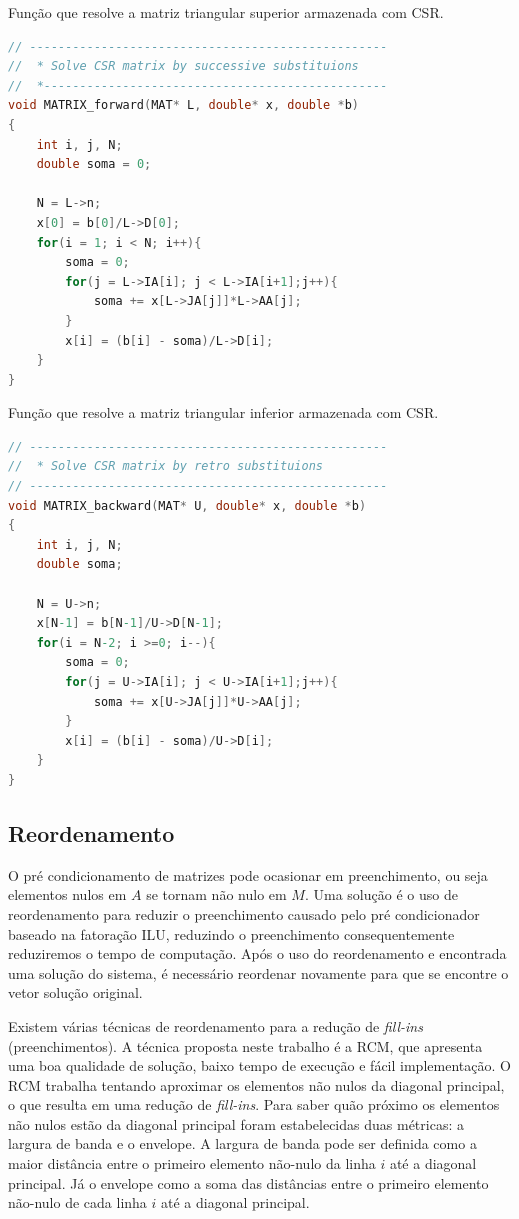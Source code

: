 \documentclass[
	11pt,				%
	oneside,			%
	a4paper,			%
	english,			%
	brazil,				%
	]{article}
\begin{document}
Função que resolve a matriz triangular superior armazenada com CSR.
\begin{lstlisting}[language=C, caption=Matrix Forward ]
// --------------------------------------------------
//  * Solve CSR matrix by successive substituions
//  *------------------------------------------------
void MATRIX_forward(MAT* L, double* x, double *b)
{
	int i, j, N;
	double soma = 0;

    N = L->n;
	x[0] = b[0]/L->D[0];
	for(i = 1; i < N; i++){
		soma = 0;
		for(j = L->IA[i]; j < L->IA[i+1];j++){
			soma += x[L->JA[j]]*L->AA[j];
		}
		x[i] = (b[i] - soma)/L->D[i];
	}
}
\end{lstlisting}

Função que resolve a matriz triangular inferior armazenada com CSR.
\begin{lstlisting}[language=C, caption=Matrix Backward]
// --------------------------------------------------
//  * Solve CSR matrix by retro substituions
// --------------------------------------------------
void MATRIX_backward(MAT* U, double* x, double *b)
{
	int i, j, N;
	double soma;

    N = U->n;
	x[N-1] = b[N-1]/U->D[N-1];
	for(i = N-2; i >=0; i--){
		soma = 0;
		for(j = U->IA[i]; j < U->IA[i+1];j++){
			soma += x[U->JA[j]]*U->AA[j];
		}
		x[i] = (b[i] - soma)/U->D[i];
	}
}
\end{lstlisting}

\subsection{Reordenamento}
O pré condicionamento de matrizes pode ocasionar em preenchimento, ou seja elementos nulos em $A$ se tornam não nulo em $M$. Uma solução é o uso de reordenamento para reduzir o preenchimento causado pelo pré condicionador baseado na fatoração ILU, reduzindo o preenchimento consequentemente reduziremos o tempo de computação. Após o uso do reordenamento e encontrada uma solução do sistema, é necessário reordenar novamente para que se encontre o vetor solução original.

Existem várias técnicas de reordenamento para a redução de \textit{fill-ins} (preenchimentos). A técnica proposta neste trabalho é a RCM, que apresenta uma boa qualidade de solução, baixo tempo de execução e fácil implementação. O RCM trabalha tentando aproximar os elementos não nulos da diagonal principal, o que resulta em uma redução de \textit{fill-ins}. Para saber quão próximo os elementos não nulos estão da diagonal principal foram estabelecidas duas métricas: a largura de banda e o envelope. A largura de banda pode ser definida como a maior distância entre o primeiro elemento não-nulo da linha $i$ até a diagonal principal. Já o envelope como a soma das distâncias entre o primeiro elemento não-nulo de cada linha $i$ até a diagonal principal.
\end{document}
